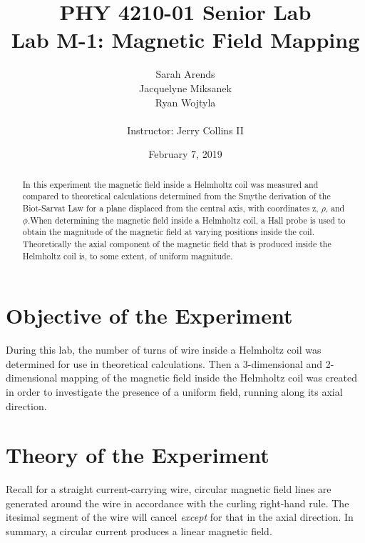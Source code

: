 \documentclass[a4paper]{article}
\title{PHY 4210-01 Senior Lab \\Lab M-1: Magnetic Field Mapping}
\author{Sarah Arends \\ 
        Jacquelyne Miksanek \\
        Ryan Wojtyla \\ \\
        Instructor: Jerry Collins II}
\date{February 7, 2019}
\begin{document}
\maketitle 

\begin{abstract}
  \qq In this experiment the magnetic field inside a Helmholtz coil was measured and
  compared to theoretical calculations determined from the Smythe derivation of
  the Biot-Sarvat Law for a plane displaced from the central axis, with
  coordinates z, $\rho$, and $\phi$.When determining the magnetic field inside a
  Helmholtz coil, a Hall probe is used to obtain the magnitude of the magnetic
  field at varying positions inside the coil. Theoretically the axial component
  of the magnetic field that is produced inside the Helmholtz coil is, to some
  extent, of uniform magnitude.
\end{abstract}

\newpage

\tableofcontents

\newpage

\section{Objective of the Experiment}
\qq During this lab, the number of turns of wire inside a Helmholtz coil was
determined for use in theoretical calculations. Then a 3-dimensional and
2-dimensional mapping of the magnetic field inside the Helmholtz coil was
created in order to investigate the presence of a uniform field, running along
its axial direction.


\section{Theory of the Experiment}



\qq Recall for a straight current-carrying wire, circular magnetic field lines are
generated around the wire in accordance with the curling right-hand rule. The
itesimal segment of the wire will cancel \textit{except} for that
in the axial direction. In summary, a circular current produces a
linear magnetic field.
\end{document}
